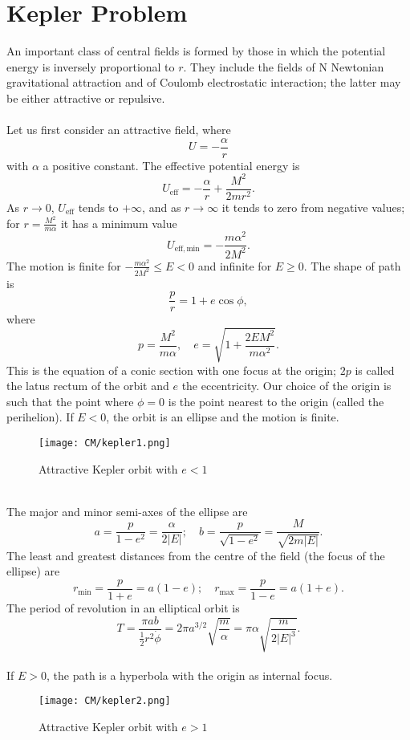 \section{Kepler Problem}
An important class of central fields is formed by those in which the potential energy is inversely proportional to $r$. They include the fields of N Newtonian gravitational attraction and of Coulomb electrostatic interaction; the latter may be either attractive or repulsive.
\\ \\
Let us first consider an attractive field, where
\[U = -\frac{\alpha}{r} \]
with $\alpha$ a positive constant. The effective potential energy is
\[U_{\mathrm{eff}} = -\frac{\alpha}{r} + \frac{M^2}{2mr^2}.\]
As $r \to 0$, $U_{\mathrm{eff}}$ tends to $+\infty$, and as $r \to \infty$ it tends to zero from negative values; for $r = \frac{M^2}{m\alpha}$ it has a minimum value
\[U_{\mathrm{eff},\mathrm{min}} = -\frac{m\alpha^2}{2M^2}.\]
The motion is finite for $-\frac{m\alpha^2}{2M^2} \leq E < 0$ and infinite for $E \ge 0$.
The shape of path is
\[\frac{p}{r} = 1 + e \cos \phi, \]
where
\[p = \frac{M^2}{m\alpha}, \quad e = \sqrt{1 + \frac{2EM^2}{m \alpha^2}}.\]
This is the equation of a conic section with one focus at the origin; $2p$ is called the latus rectum of the orbit and $e$ the eccentricity. Our choice of the origin is such that the point where $\phi = 0$ is the point nearest to the origin (called the perihelion).
If $E < 0$,  the orbit is an ellipse and the motion is finite.
\begin{figure}[!h]
	\centering
	\texttt{[image: CM/kepler1.png]}
	\caption{Attractive Kepler orbit with $e < 1$}
\end{figure}
\\
The major and minor semi-axes of the ellipse are
\[a = \frac{p}{1-e^2} = \frac{\alpha}{2|E|} ;\quad b = \frac{p}{\sqrt{1-e^2}} = \frac{M}{\sqrt{2m|E|}}.\]
The least and greatest distances from the centre of the field (the focus of the ellipse) are
\[r_{\mathrm{min}} = \frac{p}{1+e} = a(1-e) ;\quad r_{\mathrm{max}} = \frac{p}{1-e} = a(1+e).\]
The period of revolution in an elliptical orbit is
\[T = \frac{\pi a b}{\frac{1}{2}r^2 \dot{\phi}} = 2\pi a^{3/2}\sqrt{\frac{m}{\alpha}} = \pi \alpha \sqrt{\frac{m}{2|E|^3}}.\]
\\
If $E > 0$, the path is a hyperbola with the origin as internal focus. 
\begin{figure}[!h]
	\centering
	\texttt{[image: CM/kepler2.png]}
	\caption{Attractive Kepler orbit with $e > 1$}
\end{figure}
